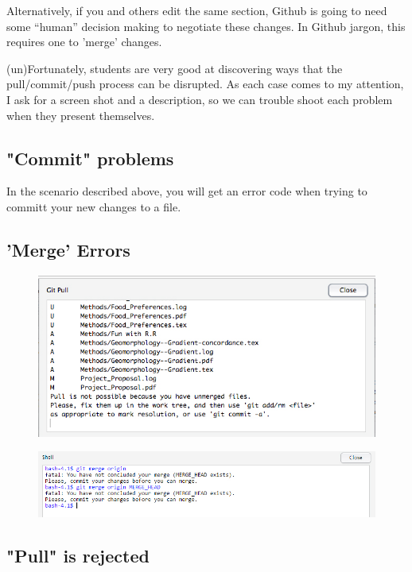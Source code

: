 \documentclass[12pt]{../SOP3_beta}
\begin{document}
\NP Alternatively, if you and others edit the same section, Github is going to need some ``human'' decision making to negotiate these changes. In Github jargon, this requires one to 'merge' changes. 

\NP (un)Fortunately, students are very good at discovering ways that the pull/commit/push process can be disrupted. As each case comes to my attention, I ask for a screen shot and a description, so we can trouble shoot each problem when they present themselves.

\subsection{"Commit" problems}
\NP In the scenario described above, you will get an error code when trying to committ your new changes to a file. 

\subsection{'Merge' Errors}

\begin{figure}
\includegraphics{graphics/UnmergedError.jpg}
\end{figure}

\begin{figure}
\includegraphics{graphics/MergeError.jpg}
\end{figure}

\subsection{"Pull" is rejected}
\end{document}
